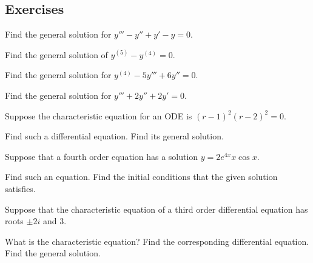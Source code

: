 \subsection{Exercises}

\begin{exercise}
Find the general solution for $y''' - y'' + y' - y = 0$.
\end{exercise}

\begin{exercise}\ansMark%
Find the general solution of $y^{(5)}-y^{(4)}=0$.
\end{exercise}

\begin{exercise}
Find the general solution for $y^{(4)} - 5 y''' + 6 y'' = 0$.
\end{exercise}

\begin{exercise}
Find the general solution for $y''' + 2 y'' + 2 y' = 0$.
\end{exercise}

\begin{exercise}
Suppose the characteristic equation for an ODE is
${(r-1)}^2{(r-2)}^2 = 0$.
\begin{tasks}
\task
Find such a differential equation.
\task
Find its general solution.
\end{tasks}
\end{exercise}

\begin{exercise} \label{hol:eqfromsolex}
Suppose that a fourth order equation has a solution
$y = 2 e^{4x} x \cos x$.  
\begin{tasks}
\task
Find such an equation.
\task
Find the initial conditions that the given
solution satisfies.
\end{tasks}
\end{exercise}

\begin{exercise}\ansMark
\pagebreak[2]
Suppose that the characteristic equation of a third order differential
equation has
roots $\pm 2i$ and 3.
\begin{tasks}
\task
What is the characteristic equation?
\task
Find the
corresponding differential equation.
\task
Find the general solution.
\end{tasks}
\end{exercise}

